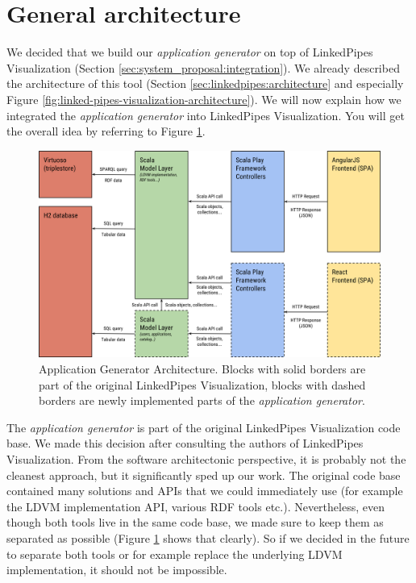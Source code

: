 \section{General architecture}

We decided that we build our \emph{application generator} on top of LinkedPipes Visualization (Section \ref{sec:system_proposal:integration}). We already described the architecture of this tool (Section \ref{sec:linkedpipes:architecture} and especially Figure \ref{fig:linked-pipes-visualization-architecture}). We will now explain how we integrated the \emph{application generator} into LinkedPipes Visualization. You will get the overall idea by referring to Figure \ref{fig:application-generator-architecture}.

\begin{figure}
	\centering
	\includegraphics[width=140mm]{img/05_application_generator_architecture.png}
	\caption{Application Generator Architecture. Blocks with solid borders are part of the original LinkedPipes Visualization, blocks with dashed borders are newly implemented parts of the \emph{application generator}.} 
	\label{fig:application-generator-architecture}
\end{figure}

The \emph{application generator} is part of the original LinkedPipes Visualization code base. We made this decision after consulting the authors of LinkedPipes Visualization. From the software architectonic perspective, it is probably not the cleanest approach, but it significantly sped up our work. The original code base contained many solutions and APIs that we could immediately use (for example the LDVM implementation API, various RDF tools etc.). Nevertheless, even though both tools live in the same code base, we made sure to keep them as separated as possible (Figure \ref{fig:application-generator-architecture} shows that clearly). So if we decided in the future to separate both tools or for example replace the underlying LDVM implementation, it should not be impossible.

